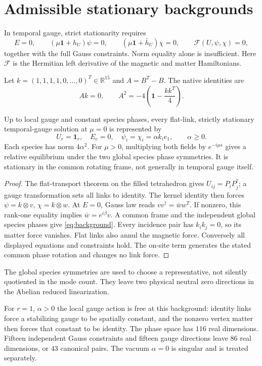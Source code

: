 \documentclass[11pt,a4paper]{article}
\newcommand{\id}{\mathbf1}\newcommand{\dd}{\mathrm d}\newcommand{\diag}{\operatorname{diag}}
\begin{document}
\newpage
\section{Admissible stationary backgrounds}
In temporal gauge, strict stationarity requires
\[
E=0,\qquad(\mu\id+h_U)\psi=0,\qquad
(\mu\id+\bar h_U)\chi=0,\qquad \mathcal F(U,\psi,\chi)=0,
\]
together with the full Gauss constraints. Norm equality alone is insufficient. Here $\mathcal F$ is the Hermitian left derivative of the magnetic and matter Hamiltonians.

Let $k=(1,1,1,1,0,\ldots,0)^T\in\mathbb R^{15}$ and $A=B^T-B$. The native identities are
\[
Ak=0,\qquad A^2=-4\left(\id-\frac{kk^T}{4}\right).
\]
\begin{proposition}[Complete flat family at $\mu=0$]
Up to local gauge and constant species phases, every flat-link, strictly stationary temporal-gauge solution at $\mu=0$ is represented by
\begin{equation}
U_e=\id_r,\quad E_e=0,\quad
\psi_i=\chi_i=\alpha k_i e_1,\qquad \alpha\geq0.\label{eq:background}
\end{equation}
Each species has norm $4\alpha^2$. For $\mu>0$, multiplying both fields by $e^{-i\mu s}$ gives a relative equilibrium under the two global species phase symmetries. It is stationary in the common rotating frame, not generally in temporal gauge itself.
\end{proposition}
\begin{proof}
The flat-transport theorem on the filled tetrahedron gives $U_{ij}=P_iP_j^\dagger$; a gauge transformation sets all links to identity. The kernel identity then forces $\psi=k\otimes v$, $\chi=k\otimes w$. At $E=0$, Gauss law reads $vv^\dagger=\bar w w^T$. If nonzero, this rank-one equality implies $\bar w=e^{i\beta}v$. A common frame and the independent global species phases give \eqref{eq:background}. Every incidence pair has $k_ik_j=0$, so its matter force vanishes. Flat links also annul the magnetic force. Conversely all displayed equations and constraints hold. The on-site term generates the stated common phase rotation and changes no link force.
\end{proof}
The global species symmetries are used to choose a representative, not silently quotiented in the mode count. They leave two physical neutral zero directions in the Abelian reduced linearization.

For $r=1$, $\alpha>0$ the local gauge action is free at this background: identity links force a stabilizing gauge to be spatially constant, and the nonzero vertex matter then forces that constant to be identity. The phase space has $116$ real dimensions. Fifteen independent Gauss constraints and fifteen gauge directions leave $86$ real dimensions, or $43$ canonical pairs. The vacuum $\alpha=0$ is singular and is treated separately.
\end{document}
